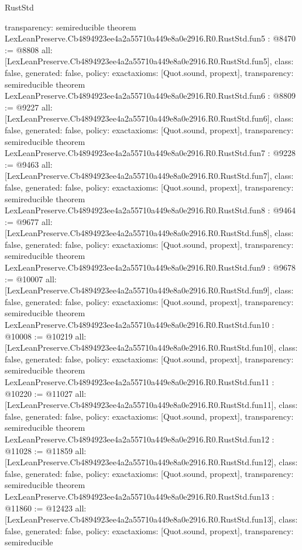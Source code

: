 \begin{lexlean}{RustStd}
\begin{coremodule}
{  transparency: semireducible
}
theorem LexLeanPreserve.Cb4894923ee4a2a55710a449e8a0e2916.R0.RustStd.fun5 : @8470 := @8808 {
  all: [LexLeanPreserve.Cb4894923ee4a2a55710a449e8a0e2916.R0.RustStd.fun5],
  class: false,
  generated: false,
  policy: exact{axioms: [Quot.sound, propext]},
  transparency: semireducible
}
theorem LexLeanPreserve.Cb4894923ee4a2a55710a449e8a0e2916.R0.RustStd.fun6 : @8809 := @9227 {
  all: [LexLeanPreserve.Cb4894923ee4a2a55710a449e8a0e2916.R0.RustStd.fun6],
  class: false,
  generated: false,
  policy: exact{axioms: [Quot.sound, propext]},
  transparency: semireducible
}
theorem LexLeanPreserve.Cb4894923ee4a2a55710a449e8a0e2916.R0.RustStd.fun7 : @9228 := @9463 {
  all: [LexLeanPreserve.Cb4894923ee4a2a55710a449e8a0e2916.R0.RustStd.fun7],
  class: false,
  generated: false,
  policy: exact{axioms: [Quot.sound, propext]},
  transparency: semireducible
}
theorem LexLeanPreserve.Cb4894923ee4a2a55710a449e8a0e2916.R0.RustStd.fun8 : @9464 := @9677 {
  all: [LexLeanPreserve.Cb4894923ee4a2a55710a449e8a0e2916.R0.RustStd.fun8],
  class: false,
  generated: false,
  policy: exact{axioms: [Quot.sound, propext]},
  transparency: semireducible
}
theorem LexLeanPreserve.Cb4894923ee4a2a55710a449e8a0e2916.R0.RustStd.fun9 : @9678 := @10007 {
  all: [LexLeanPreserve.Cb4894923ee4a2a55710a449e8a0e2916.R0.RustStd.fun9],
  class: false,
  generated: false,
  policy: exact{axioms: [Quot.sound, propext]},
  transparency: semireducible
}
theorem LexLeanPreserve.Cb4894923ee4a2a55710a449e8a0e2916.R0.RustStd.fun10 : @10008 := @10219 {
  all: [LexLeanPreserve.Cb4894923ee4a2a55710a449e8a0e2916.R0.RustStd.fun10],
  class: false,
  generated: false,
  policy: exact{axioms: [Quot.sound, propext]},
  transparency: semireducible
}
theorem LexLeanPreserve.Cb4894923ee4a2a55710a449e8a0e2916.R0.RustStd.fun11 : @10220 := @11027 {
  all: [LexLeanPreserve.Cb4894923ee4a2a55710a449e8a0e2916.R0.RustStd.fun11],
  class: false,
  generated: false,
  policy: exact{axioms: [Quot.sound, propext]},
  transparency: semireducible
}
theorem LexLeanPreserve.Cb4894923ee4a2a55710a449e8a0e2916.R0.RustStd.fun12 : @11028 := @11859 {
  all: [LexLeanPreserve.Cb4894923ee4a2a55710a449e8a0e2916.R0.RustStd.fun12],
  class: false,
  generated: false,
  policy: exact{axioms: [Quot.sound, propext]},
  transparency: semireducible
}
theorem LexLeanPreserve.Cb4894923ee4a2a55710a449e8a0e2916.R0.RustStd.fun13 : @11860 := @12423 {
  all: [LexLeanPreserve.Cb4894923ee4a2a55710a449e8a0e2916.R0.RustStd.fun13],
  class: false,
  generated: false,
  policy: exact{axioms: [Quot.sound, propext]},
  transparency: semireducible
}
\end{coremodule}
\end{lexlean}
